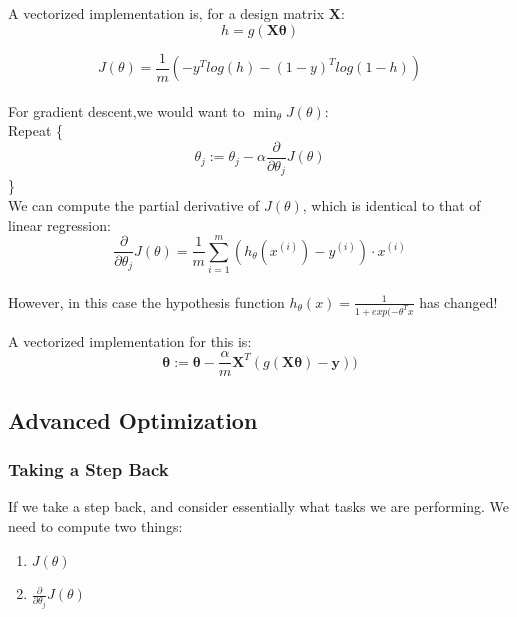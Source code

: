             A vectorized implementation is, for a design matrix $\mathbf{X}$:
            \begin{equation}
                \boxed{
                    h = g(\mathbf{X\theta})
                }
                \label{eq:vectorized-logistic-hypothesis}
            \end{equation} 

            
            \begin{equation}
                \boxed{
                    J (\theta) = \frac{1}{m} (-y^T log(h) - (1-y)^T log(1-h) )
                }
                \label{eq:vectorized-logistic-cost-function}
            \end{equation} \\

            
            For gradient descent,we would want to $\min_{\theta} J(\theta)$:\\ 
             Repeat \{
                \[ \theta_j := \theta_j - \alpha \frac{\partial }{\partial \theta_j} J(\theta)\] \}\\

   
            We can compute the partial derivative of $J(\theta)$, which is identical to that of linear regression:
            \[
                \frac{\partial }{\partial \theta_j} J(\theta) = \frac{1}{m} \sum_{i=1}^{m} ( h_\theta (x^{(i)}) - y^{(i)} )\cdot x^{(i)} 
            \]\\
            However, in this case the hypothesis function $h_\theta(x) = \frac{1}{1+exp(-\theta^T x}$ has changed!

            A vectorized implementation for this is:
            \begin{equation}
                \boxed{
                    \mathbf{\theta} := \mathbf{\theta} - \frac{\alpha}{m} \mathbf{X}^T( g (\mathbf{X\theta}) - \mathbf{y}))
                }
                \label{eq:vectorized-logistic-gradient-decent}
            \end{equation}



    \subsection{Advanced Optimization}
        \subsubsection{Taking a Step Back}
            If we take a step back, and consider essentially what tasks we are performing. We need to compute two things:
            \begin{enumerate}
                \item $J(\theta)$
                \item $\frac{\partial}{\partial \theta_j}J(\theta)$
            \end{enumerate}

